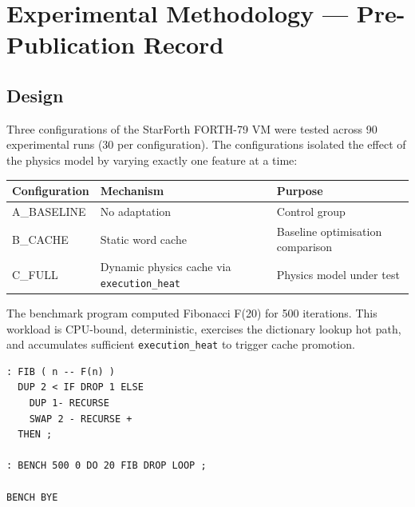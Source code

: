 
\section{Experimental Methodology --- Pre-Publication Record}

\subsection{Design}

Three configurations of the StarForth FORTH-79 VM were tested across 90 experimental
runs (30 per configuration). The configurations isolated the effect of the physics model
by varying exactly one feature at a time:

\begin{center}
\begin{tabular}{lll}
\toprule
Configuration & Mechanism & Purpose \\
\midrule
A\_BASELINE & No adaptation & Control group \\
B\_CACHE & Static word cache & Baseline optimisation comparison \\
C\_FULL & Dynamic physics cache via \texttt{execution\_heat} & Physics model under test \\
\bottomrule
\end{tabular}
\end{center}

The benchmark program computed Fibonacci F(20) for 500 iterations. This workload is
CPU-bound, deterministic, exercises the dictionary lookup hot path, and accumulates
sufficient \texttt{execution\_heat} to trigger cache promotion.

\begin{lstlisting}[language=forth]
: FIB ( n -- F(n) )
  DUP 2 < IF DROP 1 ELSE
    DUP 1- RECURSE
    SWAP 2 - RECURSE +
  THEN ;

: BENCH 500 0 DO 20 FIB DROP LOOP ;

BENCH BYE
\end{lstlisting}

